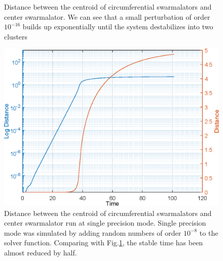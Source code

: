 \documentclass[superscriptaddress,reprint,amssymb, amsmath,aps, pre]{revtex4-1}
\begin{document}
{\begin{figure}
        \caption{Distance between the centroid of circumferential swarmalators and center swarmalator. We can see that a small perturbation of order \(10^{-16}\) builds up exponentially until the system destabilizes into two clusters}
        \label{fig:centerDistVtime}
    \end{figure}
    \begin{figure}
        \includegraphics[width = \linewidth]{centerDistVtimeError.eps}
        \caption{Distance between the centroid of circumferential swarmalators and center swarmalator run at single precision mode. Single precision mode was simulated by adding random numbers of order \(10^{-8}\) to the solver function. Comparing with Fig.\ref*{fig:centerDistVtime}, the stable time has been almost reduced by half.}
        \label{fig:centerDistVtimeError}
    \end{figure}
}
\end{document}

